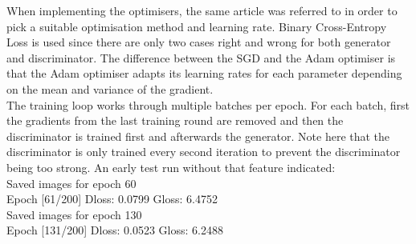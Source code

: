 When implementing the optimisers, the same article\cite{brownlee_tips_2019} was referred to in order to pick a suitable optimisation method and learning rate. Binary Cross-Entropy Loss is used since there are only two cases right and wrong for both generator and discriminator. The difference between the SGD and the Adam optimiser is that the Adam optimiser adapts its learning rates for each parameter depending  on the mean and variance of the gradient. \\
The training loop works through multiple batches per epoch. For each batch, first the gradients from the last training round are removed and then the discriminator is trained first and afterwards the generator. Note here that the discriminator is only trained every second iteration to prevent the discriminator being too strong. An early test run without that feature indicated: \\
\newline 
Saved images for epoch 60\\
Epoch [61/200] Dloss: 0.0799 Gloss: 6.4752\\
Saved images for epoch 130\\
Epoch [131/200] Dloss: 0.0523 Gloss: 6.2488\\

